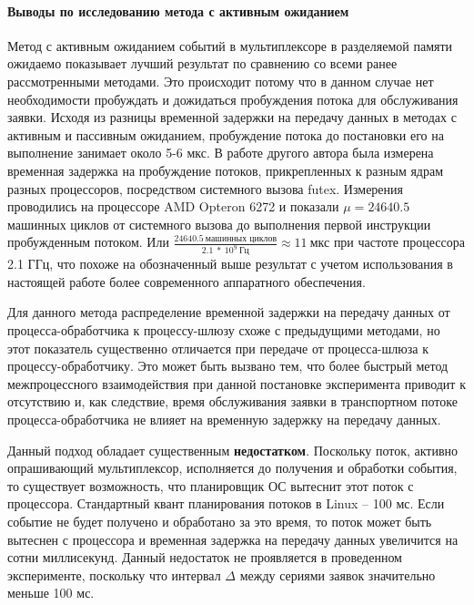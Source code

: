 \paragraph{Выводы по исследованию метода с активным ожиданием}
Метод с активным ожиданием событий в мультиплексоре в разделяемой памяти ожидаемо показывает лучший результат по сравнению со всеми ранее рассмотренными методами. Это происходит потому что в данном случае нет необходимости пробуждать и дожидаться пробуждения потока для обслуживания заявки. Исходя из разницы временной задержки на передачу данных в методах с активным и пассивным ожиданием, пробуждение потока до постановки его на выполнение занимает около 5-6 мкс.
В работе другого автора \cite{8526899} была измерена временная задержка на пробуждение потоков, прикрепленных к разным ядрам разных процессоров, посредством системного вызова futex. Измерения проводились на процессоре AMD Opteron 6272 и показали $\mu = 24640.5$ машинных циклов от системного вызова до выполнения первой инструкции пробужденным потоком. Или $\frac{24640.5~\text{машинных~циклов}}{2.1~*~10^9~\text{Гц}} \approx 11 ~\text{мкс}$ при частоте процессора 2.1 ГГц, что похоже на обозначенный выше результат с учетом использования в настоящей работе более современного аппаратного обеспечения.

Для данного метода распределение временной задержки на передачу данных от процесса-обработчика к процессу-шлюзу схоже с предыдущими методами, но этот показатель существенно отличается при передаче от процесса-шлюза к процессу-обработчику. Это может быть вызвано тем, что более быстрый метод межпроцессного взаимодействия при данной постановке эксперимента приводит к отсутствию и, как следствие, время обслуживания заявки в транспортном потоке процесса-обработчика не влияет на временную задержку на передачу данных.

Данный подход обладает существенным \textbf{недостатком}. Поскольку поток, активно опрашивающий мультиплексор, исполняется до получения и обработки события, то существует возможность, что планировщик ОС вытеснит этот поток с процессора. Стандартный квант планирования потоков в Linux -- 100 мс. Если событие не будет получено и обработано за это время, то поток может быть вытеснен с процессора и временная задержка на передачу данных увеличится на сотни миллисекунд. Данный недостаток не проявляется в проведенном эксперименте, поскольку что интервал $\Delta$ между сериями заявок значительно меньше 100 мс.
